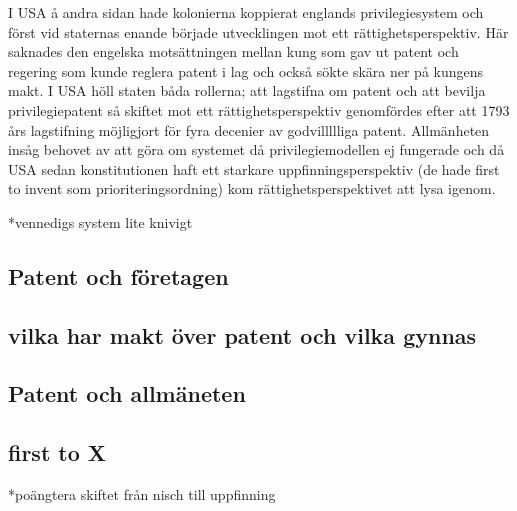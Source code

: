 I USA å andra sidan hade kolonierna koppierat englands privilegiesystem och först vid staternas enande började utvecklingen mot ett rättighetsperspektiv. Här saknades den engelska motsättningen mellan kung som gav ut patent och regering som kunde reglera patent i lag och också sökte skära ner på kungens makt. I USA höll staten båda rollerna; att lagstifna om patent och att bevilja privilegiepatent så skiftet mot ett rättighetsperspektiv genomfördes efter att 1793 års lagstifning möjligjort för fyra decenier av godvillllliga patent. Allmänheten insåg behovet av att göra om systemet då privilegiemodellen ej fungerade och då USA sedan konstitutionen haft ett starkare uppfinningsperspektiv (de hade first to invent som prioriteringsordning) kom rättighetsperspektivet att lysa igenom.


*vennedigs system lite knivigt

\subsection{Patent och företagen}

\subsection{vilka har makt över patent och vilka gynnas}


\subsection{Patent och allmäneten}


\subsection{first to X}

*poängtera skiftet från nisch till uppfinning